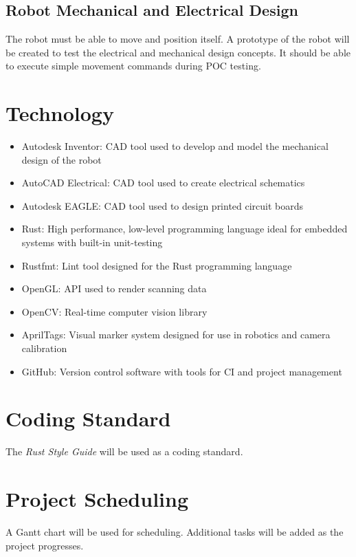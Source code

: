 \documentclass[titlepage]{article}
\begin{document}
\subsection{Robot Mechanical and Electrical Design}

The robot must be able to move and position itself. A prototype of the robot will be created to test the electrical and mechanical design concepts. It should be able to execute simple movement commands during POC testing.

\section{Technology}

\begin{itemize}
\item Autodesk Inventor: CAD tool used to develop and model the mechanical design of the robot
\item AutoCAD Electrical: CAD tool used to create electrical schematics
\item Autodesk EAGLE: CAD tool used to design printed circuit boards
\item Rust: High performance, low-level programming language ideal for embedded systems with built-in unit-testing
\item Rustfmt: Lint tool designed for the Rust programming language
\item OpenGL: API used to render scanning data
\item OpenCV: Real-time computer vision library 
\item AprilTags: Visual marker system designed for use in robotics and camera calibration
\item GitHub: Version control software with tools for CI and project management

\end{itemize}

\section{Coding Standard}

The \textit{Rust Style Guide} will be used as a coding standard.

\section{Project Scheduling}

A Gantt chart will be used for scheduling. Additional tasks will be added as the project progresses.
\end{document}
